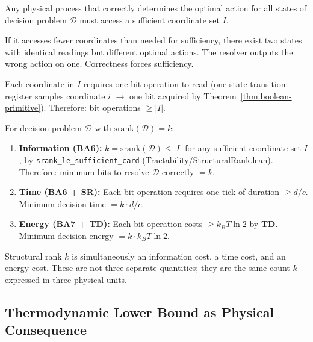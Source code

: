 \begin{theorem}\label{thm:resolution-sufficient}
Any physical process that correctly determines the optimal action for all states
of decision problem $\mathcal{D}$ must access a sufficient coordinate set $I$.

If it accesses fewer coordinates than needed for sufficiency, there exist two
states with identical readings but different optimal actions. The resolver
outputs the wrong action on one. Correctness forces sufficiency.

Each coordinate in $I$ requires one bit operation to read (one state transition:
register samples coordinate $i$ $\to$ one bit acquired by Theorem~\ref{thm:boolean-primitive}).
Therefore: bit operations $\geq |I|$.
\end{theorem}

\begin{theorem}[Structural Rank = Minimum Bit Operations]\label{thm:srank-physical}
For decision problem $\mathcal{D}$ with $\mathrm{srank}(\mathcal{D}) = k$:

\begin{enumerate}
\item \textbf{Information (BA6):}
  $k = \mathrm{srank}(\mathcal{D}) \leq |I|$ for any sufficient coordinate set $I$,
  by \texttt{srank\_le\_sufficient\_card} (Tractability/StructuralRank.lean).
  Therefore: minimum bits to resolve $\mathcal{D}$ correctly $= k$.

\item \textbf{Time (BA6 + SR):}
  Each bit operation requires one tick of duration $\geq d/c$.
  Minimum decision time $= k \cdot d/c$.

\item \textbf{Energy (BA7 + TD):}
  Each bit operation costs $\geq k_B T \ln 2$ by \textbf{TD}.
  Minimum decision energy $= k \cdot k_B T \ln 2$.
\end{enumerate}

Structural rank $k$ is simultaneously an information cost, a time cost,
and an energy cost. These are not three separate quantities; they are the
same count $k$ expressed in three physical units.
\end{theorem}

\subsection{Thermodynamic Lower Bound as Physical Consequence}\label{sec:thermo-derived}

